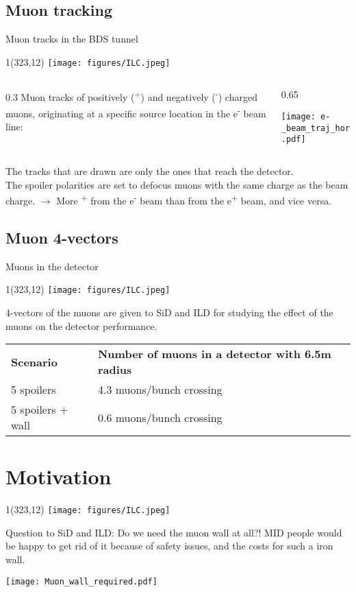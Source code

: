 \documentclass[xcolor={dvipsnames}]{beamer}
\newcommand{\ilclogo}{
  \setlength{\TPHorizModule}{1pt}
  \setlength{\TPVertModule}{1pt}
  \begin{textblock}{1}(323,12)
   \texttt{[image: figures/ILC.jpeg]}
  \end{textblock}
}
\begin{document}
\subsection{Muon tracking}
\begin{frame}{Muon tracks in the BDS tunnel}
\ilclogo

\begin{columns}
 \begin{column}{0.3\textwidth}
  Muon tracks of positively (\textcolor{green}{\textmu\textsuperscript{+}}) and negatively (\textcolor{red}{\textmu\textsuperscript{-}}) charged muons, originating at a specific source location in the e\textsuperscript{-} beam line:
 \end{column}
 \begin{column}{0.65\textwidth}
  \begin{center}
\texttt{[image: e-\_beam\_traj\_hor.pdf]}
\end{center}
 \end{column}
\end{columns}

\small The tracks that are drawn are only the ones that reach the detector.\\
\small The spoiler polarities are set to defocus muons with the same charge as the beam charge. $\rightarrow$ More \textmu\textsuperscript{+} from the e\textsuperscript{-} beam than from the e\textsuperscript{+} beam, and vice versa.
\end{frame}

\subsection{Muon 4-vectors}
\begin{frame}{Muons in the detector}
\ilclogo
4-vectors of the muons are given to SiD and ILD for studying the effect of the muons on the detector performance.\\
\vspace*{0.2cm}
\begin{tabular}{ll}
\textbf{Scenario} & \textbf{Number of muons in a detector with 6.5m radius}\\
 5 spoilers& 4.3 muons/bunch crossing\\
 5 spoilers + wall & 0.6 muons/bunch crossing
\end{tabular}
\end{frame}

\section{Motivation}
\begin{frame}{}
\ilclogo
Question to SiD and ILD: Do we need the muon wall at all?!
MID people would be happy to get rid of it because of safety issues, and the costs for such a iron wall.
\begin{center}
\texttt{[image: Muon\_wall\_required.pdf]}
\end{center}
\end{frame}
\end{document}
